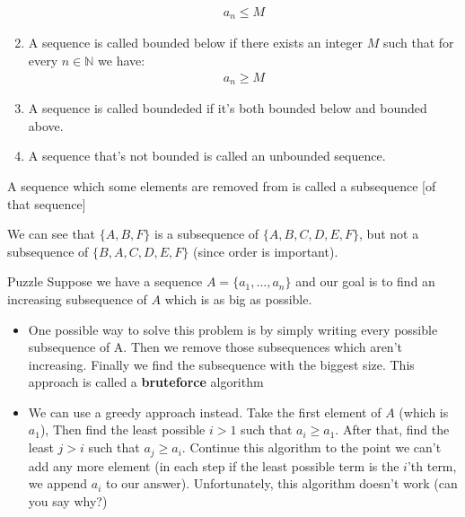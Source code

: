 \begin{DEFINITION}
\begin{enumerate}
\begin{align*}
                a_n \leq M
            \end{align*}
        \item
            A sequence is called {\color{red} bounded below} if there exists an integer $M$ such that for every $n \in \mathbb{N}$ we have:
            \begin{align*}
                a_n \geq M
            \end{align*}
        \item
            A sequence is called {\color{red} boundeded} if it's both bounded below and bounded above.
        \item A sequence that's not bounded is called an {\color{red} unbounded} sequence.
    \end{enumerate}
\end{DEFINITION}

\begin{DEFINITION}
    \p
    A sequence which some elements are removed from is called a subsequence [of that sequence] 
\end{DEFINITION}

\p
We can see that $\{A,B,F\}$ is a subsequence of $\{A,B,C,D,E,F\}$, but not a subsequence of $\{B,A,C,D,E,F\}$ (since order is important).



\begin{EXTRA}{Puzzle}
    Suppose we have a sequence $A = \{a_1, ..., a_n\}$ and our goal is to find an increasing subsequence of $A$ which is as big as possible. 
    
    \begin{itemize}
    \item 
        One possible way to solve this problem is by simply writing every possible subsequence of A. Then we remove those subsequences which aren't increasing. Finally we find the subsequence with the biggest size. This approach is called a \textbf{bruteforce} algorithm
    \item
        We can use a greedy approach instead. Take the first element of $A$ (which is $a_1$), Then find the least possible $i > 1$ such that $a_i \geq a_1$. After that, find the least $j > i$ such that $a_j \geq a_i$. Continue this algorithm to the point we can't add any more element (in each step if the least possible term is the $i$'th term, we append $a_i$ to our answer). Unfortunately, this algorithm doesn't work \Sadey[][green] (can you say why?)
    \end{itemize}
\end{EXTRA}


